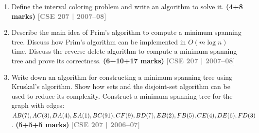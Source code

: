 \documentclass[12pt,a3paper]{article}
\newcommand{\yr}[1]{\hfill\textcolor{gray}{\small\textbf{[#1]}}}
\newcommand{\mk}[1]{\textcolor{orange!70!black}{\small\textbf{(#1 marks)}}}
\begin{document}
\begin{enumerate}
\item Define the interval coloring problem and write an algorithm to solve it. \mk{4+8}
\yr{CSE 207 | 2007--08}

\item Describe the main idea of Prim's algorithm to compute a minimum spanning tree. Discuss how Prim's algorithm can be implemented in $O(m \log n)$ time. Discuss the reverse-delete algorithm to compute a minimum spanning tree and prove its correctness. \mk{6+10+17}
\yr{CSE 207 | 2007--08}

\item Write down an algorithm for constructing a minimum spanning tree using Kruskal's algorithm. Show how sets and the disjoint-set algorithm can be used to reduce its complexity. Construct a minimum spanning tree for the graph with edges: $AB(7), AC(3), DA(4), EA(1), BC(91), CF(9), BD(7), EB(2), FB(5), CE(4), DE(6),\\ FD(3)$. \mk{5+5+5}
\yr{CSE 207 | 2006--07}


\gdef\drawKruskalNodesSix{
  \node[stepnode] (A) at (90:3.5)  {A};
  \node[stepnode] (B) at (30:3.5)  {B};
  \node[stepnode] (F) at (-30:3.5) {F};
  \node[stepnode] (D) at (-90:3.5) {D};
  \node[stepnode] (E) at (-150:3.5){E};
  \node[stepnode] (C) at (150:3.5) {C};
}


\end{enumerate}
\end{document}
